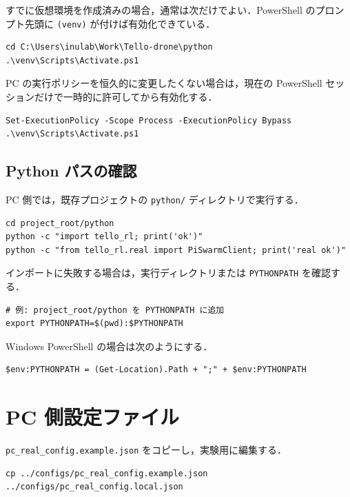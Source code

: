 すでに仮想環境を作成済みの場合，通常は次だけでよい．PowerShell のプロンプト先頭に \texttt{(venv)} が付けば有効化できている．

\begin{lstlisting}
cd C:\Users\inulab\Work\Tello-drone\python
.\venv\Scripts\Activate.ps1
\end{lstlisting}

PC の実行ポリシーを恒久的に変更したくない場合は，現在の PowerShell セッションだけで一時的に許可してから有効化する．

\begin{lstlisting}
Set-ExecutionPolicy -Scope Process -ExecutionPolicy Bypass
.\venv\Scripts\Activate.ps1
\end{lstlisting}

\subsection{Python パスの確認}

PC 側では，既存プロジェクトの \texttt{python/} ディレクトリで実行する．

\begin{lstlisting}
cd project_root/python
python -c "import tello_rl; print('ok')"
python -c "from tello_rl.real import PiSwarmClient; print('real ok')"
\end{lstlisting}

インポートに失敗する場合は，実行ディレクトリまたは \texttt{PYTHONPATH} を確認する．

\begin{lstlisting}
# 例: project_root/python を PYTHONPATH に追加
export PYTHONPATH=$(pwd):$PYTHONPATH
\end{lstlisting}

Windows PowerShell の場合は次のようにする．

\begin{lstlisting}
$env:PYTHONPATH = (Get-Location).Path + ";" + $env:PYTHONPATH
\end{lstlisting}

\section{PC 側設定ファイル}
\label{sec:pc_config}

\texttt{pc\_real\_config.example.json} をコピーし，実験用に編集する．

\begin{lstlisting}
cp ../configs/pc_real_config.example.json ../configs/pc_real_config.local.json
\end{lstlisting}

